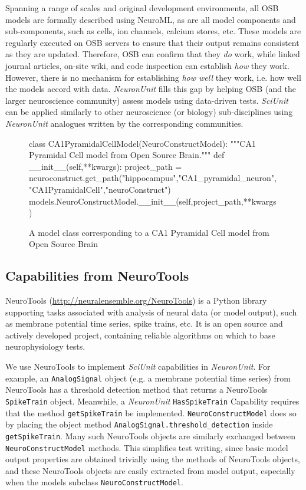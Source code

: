 \documentclass{frontiersSCNS}
\let\verbx\lstinline
\begin{document}
Spanning a range of scales and original development environments, all OSB models are formally described using NeuroML, as are all model components and sub-components, such as cells, ion channels, calcium stores, etc. 
These models are regularly executed on OSB servers to ensure that their output remains consistent as they are updated. 
Therefore, OSB can confirm that they \textit{do} work, while linked journal articles, on-site wiki, and code inspection can establish \textit{how} they work. 
However, there is no mechanism for establishing \textit{how well} they work, i.e. how well the models accord with data. 
\textit{NeuronUnit} fills this gap by helping OSB (and the larger neuroscience community) assess models using data-driven tests. 
\textit{SciUnit} can be applied similarly to other neuroscience (or biology) sub-disciplines using \textit{NeuronUnit} analogues written by the corresponding communities.    

\begin{figure}
\begin{python}
class CA1PyramidalCellModel(NeuroConstructModel):
	"""CA1 Pyramidal Cell model from Open Source Brain."""
	def __init__(self,**kwargs):
		project_path = neuroconstruct.get_path("hippocampus","CA1_pyramidal_neuron","CA1PyramidalCell","neuroConstruct")
		models.NeuroConstructModel.__init__(self,project_path,**kwargs)
\end{python}
\vspace{-5px}
\caption{A model class corresponding to a CA1 Pyramidal Cell model from Open Source Brain}
\label{fig:ca1_model}
\vspace{-15px}
\end{figure}

\subsection{Capabilities from NeuroTools}
NeuroTools (\url{http://neuralensemble.org/NeuroTools}) is a Python library supporting tasks associated with analysis of neural data (or model output), such as membrane potential time series, spike trains, etc. 
It is an open source and actively developed project, containing reliable algorithms on which to base neurophysiology tests.

We use NeuroTools to implement \textit{SciUnit} capabilities in \textit{NeuronUnit}. 
For example, an \verbx{AnalogSignal} object (e.g. a membrane potential time series) from NeuroTools has a threshold detection method that returns a NeuroTools \verbx{SpikeTrain} object. 
Meanwhile, a \textit{NeuronUnit} \verbx{HasSpikeTrain} Capability requires that the method \verbx{getSpikeTrain} be implemented. 
\verbx{NeuroConstructModel} does so by placing the object method \verbx{AnalogSignal.threshold_detection} inside \verbx{getSpikeTrain}. 
Many such NeuroTools objects are similarly exchanged between \verbx{NeuroConstructModel} methods. 
This simplifies test writing, since basic model output properties are obtained trivially using the methods of NeuroTools objects, and these NeuroTools objects are easily extracted from model output, especially when the models subclass \verbx{NeuroConstructModel}.  
\end{document}
